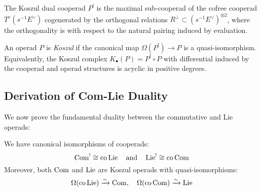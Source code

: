 \begin{definition}
The Koszul dual cooperad $P^!$ is the maximal sub-cooperad of the cofree cooperad $T^c(s^{-1}E^\vee)$ cogenerated by the orthogonal relations $R^\perp \subset (s^{-1}E^\vee)^{\otimes 2}$, where the orthogonality is with respect to the natural pairing induced by evaluation.
\end{definition}
 
\begin{definition}
An operad $P$ is \emph{Koszul} if the canonical map $\Omega(P^!) \to P$ is a quasi-isomorphism. Equivalently, the Koszul complex $K_\bullet(P) = P^! \circ P$ with differential induced by the cooperad and operad structures is acyclic in positive degrees.
\end{definition}
 
\subsection{Derivation of Com-Lie Duality}
 
We now prove the fundamental duality between the commutative and Lie operads:
 
\begin{theorem}\label{thm:com-lie}
We have canonical isomorphisms of cooperads:
\[
\operatorname{Com}^! \cong \text{co}\operatorname{Lie} \quad \text{and} \quad \operatorname{Lie}^! \cong \text{co}\operatorname{Com}
\]
Moreover, both $\operatorname{Com}$ and $\operatorname{Lie}$ are Koszul operads with quasi-isomorphisms:
\[
\Omega(\text{co}\operatorname{Lie}) \xrightarrow{\sim} \operatorname{Com}, \quad \Omega(\text{co}\operatorname{Com}) \xrightarrow{\sim} \operatorname{Lie}
\]
\end{theorem}
 
